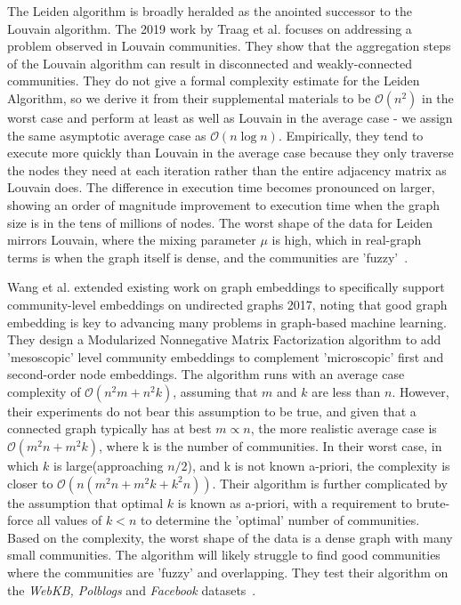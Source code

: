 \par{The Leiden algorithm is broadly heralded as the anointed successor to the Louvain algorithm. 
The 2019 work by Traag et al. focuses on addressing a problem observed in Louvain communities. 
They show that the aggregation steps of the Louvain algorithm can result in disconnected and weakly-connected communities. 
They do not give a formal complexity estimate for the Leiden Algorithm, so we derive it from their supplemental materials to be $\mathcal{O}(n^2)$ in the worst case and perform at least as well as Louvain in the average case - we assign the same asymptotic average case as $\mathcal{O}(n\log{n})$. 
Empirically, they tend to execute more quickly than Louvain in the average case because they only traverse the nodes they need at each iteration rather than the entire adjacency matrix as Louvain does. 
The difference in execution time becomes pronounced on larger, showing an order of magnitude improvement to execution time when the graph size is in the tens of millions of nodes.
The worst shape of the data for Leiden mirrors Louvain, where the mixing parameter $\mu$ is high, which in real-graph terms is when the graph itself is dense, and the communities are 'fuzzy'~\cite{Traag2019}.}

\par{Wang et al. extended existing work on graph embeddings to specifically support community-level embeddings on undirected graphs 2017, noting that good graph embedding is key to advancing many problems in graph-based machine learning. 
They design a Modularized Nonnegative Matrix Factorization algorithm to add 'mesoscopic' level community embeddings to complement 'microscopic' first and second-order node embeddings. 
The algorithm runs with an average case complexity of $\mathcal{O}(n^2m+n^2k)$, assuming that $m$ and $k$ are less than $n$. 
However, their experiments do not bear this assumption to be true, and given that a connected graph typically has at best $m\propto n$, the more realistic average case is $\mathcal{O}(m^2n+m^2k)$, where k is the number of communities. 
In their worst case, in which $k$ is large(approaching $n/2$), and k is not known a-priori, the complexity is closer to $\mathcal{O}(n(m^2 n+m^2 k+k^2 n))$.
Their algorithm is further complicated by the assumption that optimal $k$ is known as a-priori, with a requirement to brute-force all values of $k < n$ to determine the 'optimal' number of communities. 
Based on the complexity, the worst shape of the data is a dense graph with many small communities. 
The algorithm will likely struggle to find good communities where the communities are 'fuzzy' and overlapping.
They test their algorithm on the \textit{WebKB, Polblogs} and \textit{Facebook} datasets~\cite{Wang2017}.}

